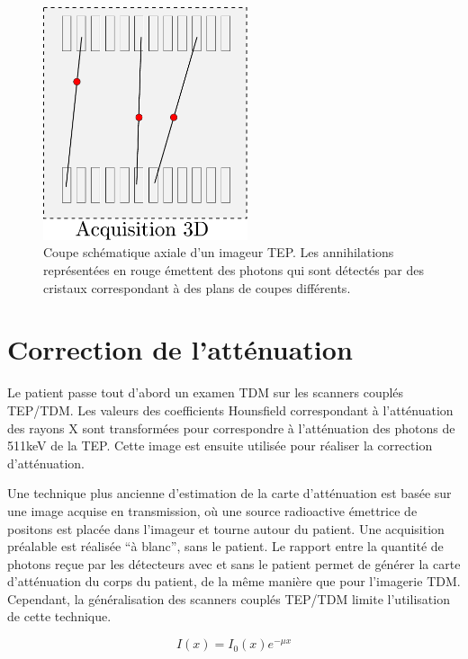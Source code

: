\begin{figure}
\centering
\includegraphics[width=6cm]{images/2D3D}
\caption[Acquisitions 3D en TEP]{Coupe schématique axiale d'un imageur TEP. Les annihilations représentées en rouge émettent des photons qui sont détectés par des cristaux correspondant à des plans de coupes différents.}
\label{fig:2D3D}
\end{figure}



	\section{Correction de l'atténuation}
\label{CorrectionAttenuation}

Le patient passe tout d'abord un examen TDM sur les scanners couplés TEP/TDM. Les valeurs des coefficients Hounsfield correspondant à l'atténuation des rayons X sont transformées pour correspondre à l'atténuation des photons de 511keV de la TEP. Cette image est ensuite utilisée pour réaliser la correction d'atténuation. 

Une technique plus ancienne d'estimation de la carte d'atténuation est basée sur une image acquise en transmission, où une source radioactive émettrice de positons est placée dans l'imageur et tourne autour du patient. Une acquisition  préalable est réalisée ``à blanc'', sans le patient. Le rapport entre la quantité de photons reçue par les détecteurs avec et sans le patient permet de générer la carte d'atténuation du corps du patient, de la même manière que pour l'imagerie TDM. Cependant, la généralisation des scanners couplés TEP/TDM limite l'utilisation de cette technique.

\begin{equation}
I(x) = I_0(x) e^{-\mu x}
\end{equation}

